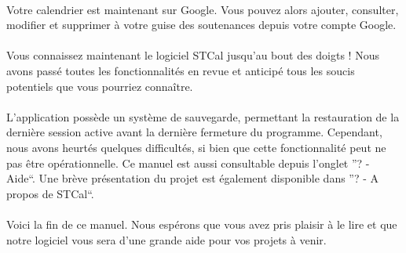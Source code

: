 \documentclass[a4paper,10pt]{report}
\begin{document}
	\paragraph{}
	  Votre calendrier est maintenant sur Google.
	  Vous pouvez alors ajouter, consulter, modifier et supprimer à votre guise des soutenances depuis votre compte Google.
	  
	\newpage
	\paragraph{}
	  Vous connaissez maintenant le logiciel STCal jusqu'au bout des doigts ! 
	  Nous avons passé toutes les fonctionnalités en revue et anticipé tous les soucis potentiels que vous pourriez connaître.
	  
	\paragraph{}
	  L'application possède un système de sauvegarde, permettant la restauration de la dernière session active avant la dernière fermeture du programme.
	  Cependant, nous avons heurtés quelques difficultés, si bien que cette fonctionnalité peut ne pas être opérationnelle.
	  Ce manuel est aussi consultable depuis l'onglet ''? - Aide``.
	  Une brève présentation du projet est également disponible dans ''? - A propos de STCal``.
	

	\paragraph{}
	  Voici la fin de ce manuel.
	  Nous espérons que vous avez pris plaisir à le lire et que notre logiciel vous sera d'une grande aide pour vos projets à venir.
\end{document}
